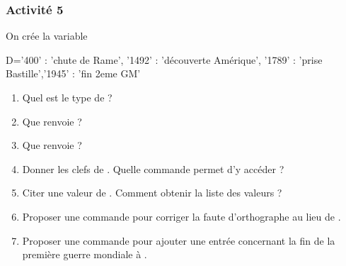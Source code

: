 \documentclass[11pt,a4paper,french,twoside]{PMCours}
\begin{document}
\subsubsection*{Activité 5}
On crée la variable 
\begin{Python}
D={'400' : 'chute de Rame', '1492' : 'découverte Amérique', '1789' : 'prise Bastille','1945' : 'fin 2eme GM'}
\end{Python}
\begin{enumerate}
\item Quel est le type de  ?
\item Que renvoie  ?  
\item Que renvoie  ?
\item Donner les clefs de . Quelle commande permet d'y accéder ?
\item Citer une valeur de . Comment obtenir la liste des valeurs ?
\item Proposer une commande pour corriger la faute d'orthographe  au lieu de .
\item Proposer une commande pour ajouter une entrée concernant la fin de la première guerre mondiale à . 
\end{enumerate} 
\end{document}
